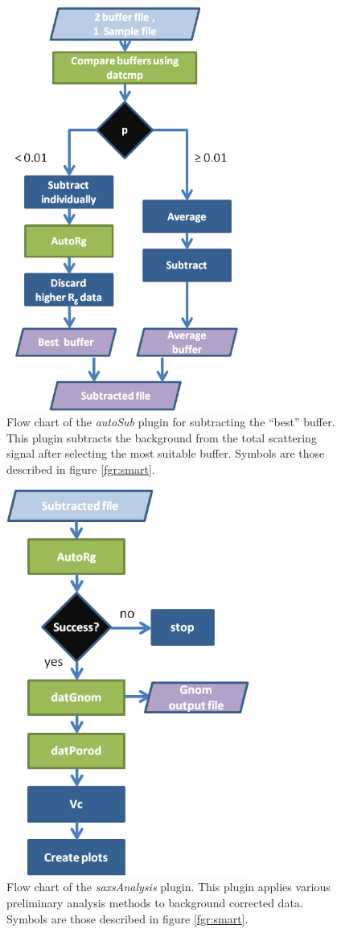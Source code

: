 \documentclass[preprint,pdf]{iucr}              %
\begin{document}
\begin{figure}
\centering
\includegraphics[width=8cm]{autosub.png}%
\caption{Flow chart of the \textit{autoSub} plugin for subtracting the ``best''
buffer.
This plugin subtracts the background from the total scattering signal after
selecting the most suitable buffer.
Symbols are those described in figure \ref{fgr:smart}.}
\label{fgr:autosub}
\end{figure}

\begin{figure}
\centering
\includegraphics[width=8cm]{analysis.png}%
\caption{Flow chart of the \textit{saxsAnalysis} plugin.
This plugin applies various preliminary analysis methods to background
corrected data.
Symbols are those described in figure \ref{fgr:smart}.}\label{fgr:analysis}
\end{figure}
\end{document}

